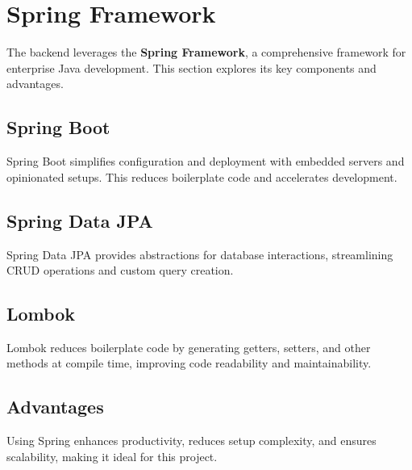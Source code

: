 \Author{\daAuthorThree}


    \section{Spring Framework}
    The backend leverages the \textbf{Spring Framework}, a comprehensive framework for enterprise Java development. This section explores its key components and advantages.

    \subsection{Spring Boot}
    Spring Boot simplifies configuration and deployment with embedded servers and opinionated setups. This reduces boilerplate code and accelerates development.

    \subsection{Spring Data JPA}
    Spring Data JPA provides abstractions for database interactions, streamlining CRUD operations and custom query creation.

    \subsection{Lombok}
    Lombok reduces boilerplate code by generating getters, setters, and other methods at compile time, improving code readability and maintainability.

    \subsection{Advantages}
    Using Spring enhances productivity, reduces setup complexity, and ensures scalability, making it ideal for this project.
